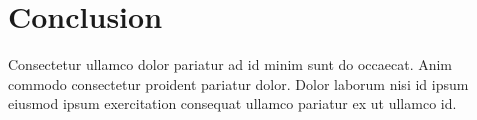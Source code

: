 \chapter{Conclusion}
\label{chap:conclusion}

Consectetur ullamco dolor pariatur ad id minim sunt do occaecat. Anim commodo consectetur proident pariatur dolor. Dolor laborum nisi id ipsum eiusmod ipsum exercitation consequat ullamco pariatur ex ut ullamco id.



%
%
